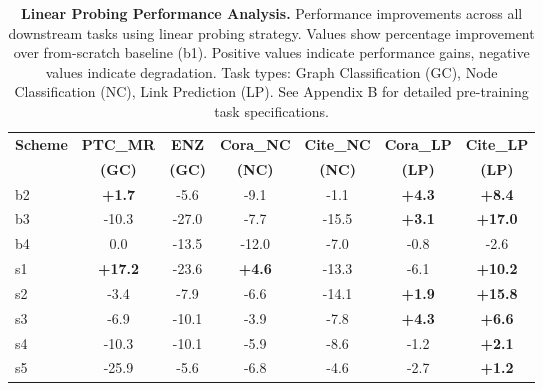\documentclass[11pt]{article}
\begin{document}
\begin{table}[!htb]
\centering
\scriptsize
\setlength{\tabcolsep}{1.5pt}
\renewcommand{\arraystretch}{1.05}
\begin{tabular}{l c c c c c c}
\toprule
\textbf{Scheme} & \textbf{PTC\_MR} & \textbf{ENZ} & \textbf{Cora\_NC} & \textbf{Cite\_NC} & \textbf{Cora\_LP} & \textbf{Cite\_LP} \\
& \textbf{(GC)} & \textbf{(GC)} & \textbf{(NC)} & \textbf{(NC)} & \textbf{(LP)} & \textbf{(LP)} \\
\midrule
b2 & \textbf{+1.7} & -5.6 & -9.1 & -1.1 & \textbf{+4.3} & \textbf{+8.4} \\
b3 & -10.3 & -27.0 & -7.7 & -15.5 & \textbf{+3.1} & \textbf{+17.0} \\
b4 & 0.0 & -13.5 & -12.0 & -7.0 & -0.8 & -2.6 \\
s1 & \textbf{+17.2} & -23.6 & \textbf{+4.6} & -13.3 & -6.1 & \textbf{+10.2} \\
s2 & -3.4 & -7.9 & -6.6 & -14.1 & \textbf{+1.9} & \textbf{+15.8} \\
s3 & -6.9 & -10.1 & -3.9 & -7.8 & \textbf{+4.3} & \textbf{+6.6} \\
s4 & -10.3 & -10.1 & -5.9 & -8.6 & -1.2 & \textbf{+2.1} \\
s5 & -25.9 & -5.6 & -6.8 & -4.6 & -2.7 & \textbf{+1.2} \\
\bottomrule
\end{tabular}
\caption{\textbf{Linear Probing Performance Analysis.} Performance improvements across all downstream tasks using linear probing strategy. Values show percentage improvement over from-scratch baseline (b1). Positive values indicate performance gains, negative values indicate degradation. Task types: Graph Classification (GC), Node Classification (NC), Link Prediction (LP). See Appendix B for detailed pre-training task specifications.}
\label{tab:linear-probe-performance}
\end{table}
\end{document}
